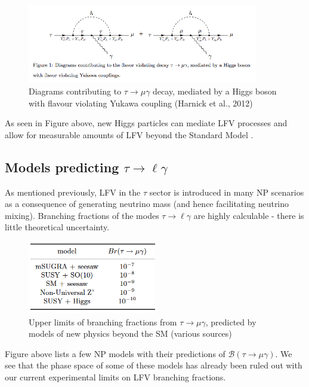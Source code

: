 \documentclass[12pt]{thesis}  %
\newcommand{\br}{\mathcal{B}}
\newcommand{\tmg}{\tau\to\mu\gamma}
\newcommand{\tlg}{\tau\to\ell\gamma}
\begin{document}
\begin{figure}[h]
\centering
\includegraphics[width=0.9\textwidth]{images/higgs-lfv-modes.png}
\caption{Diagrams contributing to $\tmg$ decay, mediated by a Higgs boson with flavour violating Yukawa coupling (Harnick et al., 2012)}
\label{}
\end{figure}

As seen in Figure above, new Higgs particles can mediate LFV processes and allow for measurable amounts of LFV beyond the Standard Model \cite{Dorsner:2015}.


\subsection{Models predicting $\tlg$}

As mentioned previously, LFV in the $\tau$ sector is introduced in many NP scenarios as a consequence of generating neutrino mass (and hence facilitating neutrino mixing). Branching fractions of the modes $\tlg$ are highly calculable - there is little theoretical uncertainty.

\begin{figure}[h]
\centering
\includegraphics[width=0.5\textwidth]{images/np-models-bounds.png}
\caption{Upper limits of branching fractions from $\tmg$, predicted by models of new physics beyond the SM (various sources)\cite{Ohshima:2007zz}}
\label{}
\end{figure}

Figure above lists a few NP models with their predictions of $\br(\tmg)$. We see that the phase space of some of these models has already been ruled out with our current experimental limits on LFV branching fractions.
\end{document}
